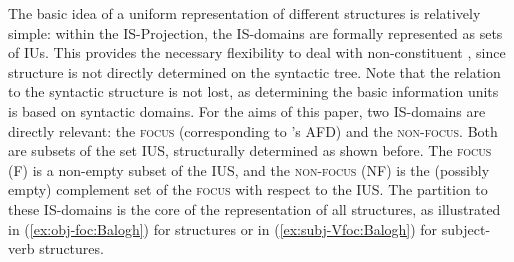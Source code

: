 \documentclass[output=paper,colorlinks,citecolor=brown]{langscibook}
\begin{document}
The basic idea of a uniform representation of different  structures is relatively simple: within the IS-Projection, the IS-domains are formally represented as sets of IUs. This provides the necessary flexibility to deal with non-constituent , since  structure is not directly determined on the syntactic tree. Note that the relation to the syntactic structure is not lost, as determining the basic information units is based on syntactic domains. For the aims of this paper, two IS-domains are directly relevant: the {\textsc{focus}} (corresponding to 's AFD) and the {\textsc{non-focus}}. Both are subsets of the set IUS, structurally determined as shown before. The {\textsc{focus}} (F) is a non-empty subset of the IUS, and the {\textsc{non-focus}} (NF) is the (possibly empty) complement set of the {\textsc{focus}} with respect to the IUS. The partition to these IS-domains is the core of the representation of all  structures, as illustrated in (\ref{ex:obj-foc:Balogh}) for   structures or in (\ref{ex:subj-Vfoc:Balogh}) for subject-verb  structures. 
\end{document}
